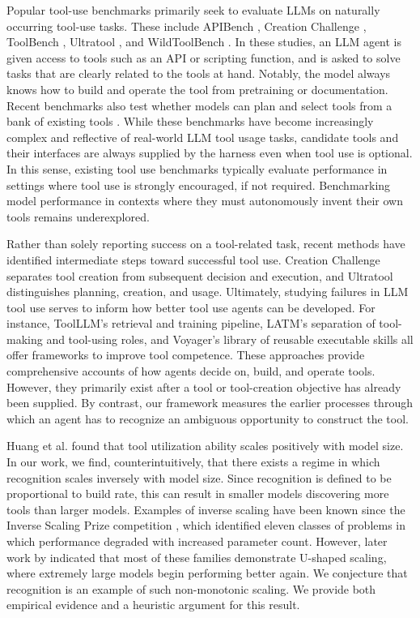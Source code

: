 \documentclass{article}
\begin{document}
Popular tool-use benchmarks primarily seek to evaluate LLMs on naturally occurring tool-use tasks. These include APIBench \citep{patil2024gorilla}, Creation Challenge \citep{qian2023creator}, ToolBench \citep{qin2024toolllm}, Ultratool \citep{huang2024ultratool}, and WildToolBench \citep{yu2026wildtoolbench}. In these studies, an LLM agent is given access to tools such as an API or scripting function, and is asked to solve tasks that are clearly related to the tools at hand. Notably, the model always knows how to build and operate the tool from pretraining or documentation. Recent benchmarks also test whether models can plan and select tools from a bank of existing tools \citep{wang2024voyager, huang2024ultratool}. While these benchmarks have become increasingly complex and reflective of real-world LLM tool usage tasks, candidate tools and their interfaces are always supplied by the harness even when tool use is optional. In this sense, existing tool use benchmarks typically evaluate performance in settings where tool use is strongly encouraged, if not required. Benchmarking model performance in contexts where they must autonomously invent their own tools remains underexplored. 

Rather than solely reporting success on a tool-related task, recent methods have identified intermediate steps toward successful tool use. Creation Challenge \citep{qian2023creator} separates tool creation from subsequent decision and execution, and Ultratool \citep{huang2024ultratool} distinguishes planning, creation, and usage. Ultimately, studying failures in LLM tool use serves to inform how better tool use agents can be developed. For instance, ToolLLM’s retrieval and training pipeline, LATM’s separation of tool-making and tool-using roles, and Voyager’s library of reusable executable skills \citep{qin2024toolllm,cai2024latm, wang2024voyager} all offer frameworks to improve tool competence. These approaches provide comprehensive accounts of how agents decide on, build, and operate tools. However, they primarily exist after a tool or tool-creation objective has already been supplied. By contrast, our framework measures the earlier processes through which an agent has to recognize an ambiguous opportunity to construct the tool.

Huang et al. \citep{huang2024ultratool} found that tool utilization ability scales positively with model size. In our work, we find, counterintuitively, that there exists a regime in which recognition scales inversely with model size. Since recognition is defined to be proportional to build rate, this can result in smaller models discovering more tools than larger models. Examples of inverse scaling have been known since the Inverse Scaling Prize competition \citep{mckenzie2023inversescaling}, which identified eleven classes of problems in which performance degraded with increased parameter count. However, later work by \citep{wei2023ushaped} indicated that most of these families demonstrate U-shaped scaling, where extremely large models begin performing better again. We conjecture that recognition is an example of such non-monotonic scaling. We provide both empirical evidence and a heuristic argument for this result.
\end{document}

